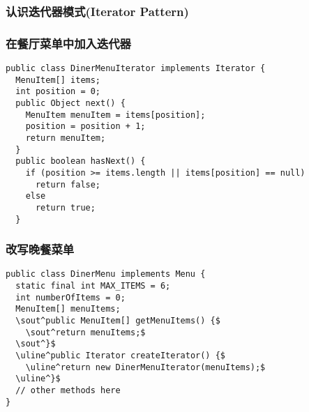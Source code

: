 \documentclass[compress]{beamer}
\begin{document}
\begin{frame}
\frametitle{认识迭代器模式(Iterator Pattern)}

\end{frame}

\begin{frame}[fragile]
\frametitle{在餐厅菜单中加入迭代器}
   \renewcommand{\baselinestretch}{1.2}
\begin{Verbatim}[label=晚餐菜单迭代器：遍历数组]
public class DinerMenuIterator implements Iterator { 
  MenuItem[] items;
  int position = 0;
  public Object next() {
    MenuItem menuItem = items[position]; 
    position = position + 1;
    return menuItem;
  }
  public boolean hasNext() {
    if (position >= items.length || items[position] == null) 
      return false; 
    else 
      return true; 
￼￼}
\end{Verbatim}
\end{frame}

\begin{frame}[fragile]
\frametitle{改写晚餐菜单}
\begin{Verbatim}[commandchars=\\\^\$]
public class DinerMenu implements Menu { 
  static final int MAX_ITEMS = 6;
  int numberOfItems = 0;
  MenuItem[] menuItems;
  \sout^public MenuItem[] getMenuItems() {$
    \sout^return menuItems;$
  \sout^}$
  \uline^public Iterator createIterator() {$
    \uline^return new DinerMenuIterator(menuItems);$
  \uline^}$
  // other methods here 
}
\end{Verbatim}
\end{frame}
\end{document}
